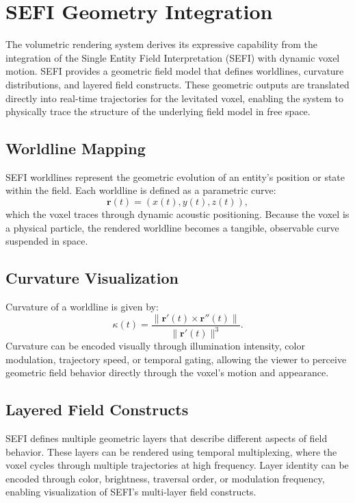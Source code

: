 \documentclass[10pt,twocolumn]{article}
\begin{document}
\section{SEFI Geometry Integration}
The volumetric rendering system derives its expressive capability from the integration of the Single Entity Field Interpretation (SEFI) with dynamic voxel motion. SEFI provides a geometric field model that defines worldlines, curvature distributions, and layered field constructs. These geometric outputs are translated directly into real-time trajectories for the levitated voxel, enabling the system to physically trace the structure of the underlying field model in free space.

\subsection{Worldline Mapping}
SEFI worldlines represent the geometric evolution of an entity's position or state within the field. Each worldline is defined as a parametric curve:
\begin{equation}
\mathbf{r}(t) = (x(t), y(t), z(t)),
\end{equation}
which the voxel traces through dynamic acoustic positioning. Because the voxel is a physical particle, the rendered worldline becomes a tangible, observable curve suspended in space.

\subsection{Curvature Visualization}
Curvature of a worldline is given by:
\begin{equation}
\kappa(t) = \frac{\|\mathbf{r}'(t) \times \mathbf{r}''(t)\|}{\|\mathbf{r}'(t)\|^3}.
\end{equation}
Curvature can be encoded visually through illumination intensity, color modulation, trajectory speed, or temporal gating, allowing the viewer to perceive geometric field behavior directly through the voxel's motion and appearance.

\subsection{Layered Field Constructs}
SEFI defines multiple geometric layers that describe different aspects of field behavior. These layers can be rendered using temporal multiplexing, where the voxel cycles through multiple trajectories at high frequency. Layer identity can be encoded through color, brightness, traversal order, or modulation frequency, enabling visualization of SEFI's multi-layer field constructs.
\end{document}

